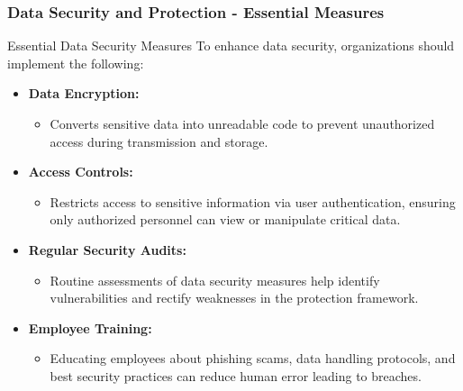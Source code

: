\documentclass{beamer}
\begin{document}
\begin{frame}[fragile]
    \frametitle{Data Security and Protection - Essential Measures}

    \begin{block}{Essential Data Security Measures}
        To enhance data security, organizations should implement the following:
    \end{block}

    \begin{itemize}
        \item \textbf{Data Encryption:}
            \begin{itemize}
                \item Converts sensitive data into unreadable code to prevent unauthorized access during transmission and storage.
            \end{itemize}
        
        \item \textbf{Access Controls:}
            \begin{itemize}
                \item Restricts access to sensitive information via user authentication, ensuring only authorized personnel can view or manipulate critical data.
            \end{itemize}
        
        \item \textbf{Regular Security Audits:}
            \begin{itemize}
                \item Routine assessments of data security measures help identify vulnerabilities and rectify weaknesses in the protection framework.
            \end{itemize}
        
        \item \textbf{Employee Training:}
            \begin{itemize}
                \item Educating employees about phishing scams, data handling protocols, and best security practices can reduce human error leading to breaches.
            \end{itemize}
    \end{itemize}
\end{frame}
\end{document}
